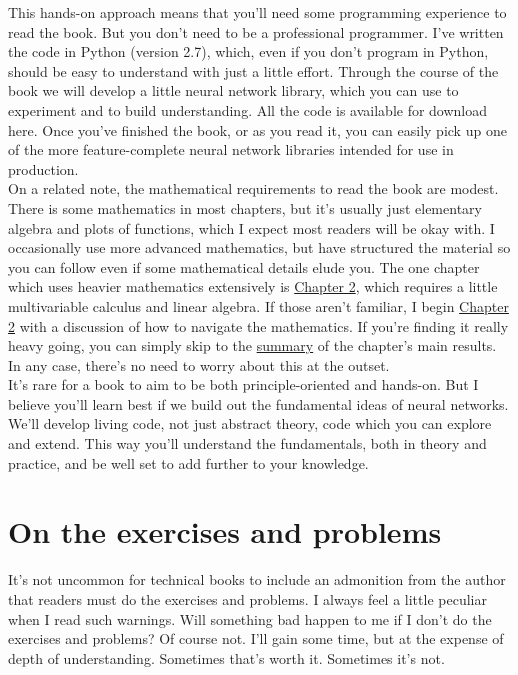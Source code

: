 This hands-on approach means that you'll need some programming experience to read the book. But you don't need to be a professional programmer. I've written the code in Python (version 2.7), which, even if you don't program in Python, should be easy to understand with just a little effort. Through the course of the book we will develop a little neural network library, which you can use to experiment and to build understanding. All the code is available for download here. Once you've finished the book, or as you read it, you can easily pick up one of the more feature-complete neural network libraries intended for use in production.\\

On a related note, the mathematical requirements to read the book are modest. There is some mathematics in most chapters, but it's usually just elementary algebra and plots of functions, which I expect most readers will be okay with. I occasionally use more advanced mathematics, but have structured the material so you can follow even if some mathematical details elude you. The one chapter which uses heavier mathematics extensively is \hyperref[chap: backpropagation]{Chapter 2}, which requires a little multivariable calculus and linear algebra. If those aren't familiar, I begin \hyperref[chap: backpropagation]{Chapter 2} with a discussion of how to navigate the mathematics. If you're finding it really heavy going, you can simply skip to the \hyperref[sec: backprop algh]{summary} of the chapter's main results. In any case, there's no need to worry about this at the outset.\\

It's rare for a book to aim to be both principle-oriented and hands-on. But I believe you'll learn best if we build out the fundamental ideas of neural networks. We'll develop living code, not just abstract theory, code which you can explore and extend. This way you'll understand the fundamentals, both in theory and practice, and be well set to add further to your knowledge.


\newpage
\chapter*{On the exercises and problems}
\label{chap: About}
It's not uncommon for technical books to include an admonition from the author that readers must do the exercises and problems. I always feel a little peculiar when I read such warnings. Will something bad happen to me if I don't do the exercises and problems? Of course not. I'll gain some time, but at the expense of depth of understanding. Sometimes that's worth it. Sometimes it's not.\\

